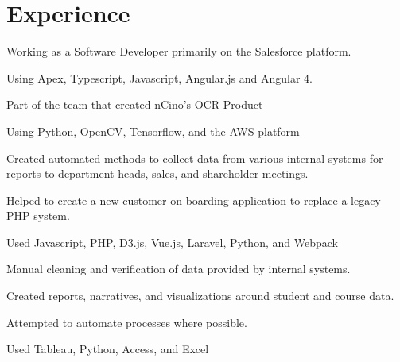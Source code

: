 \documentclass[]{deedy-resume-openfont}
\begin{document}
\begin{minipage}[t]{0.66\textwidth} 


\section{Experience}

\vspace{\topsep} %
\begin{tightemize}
\item Working as a Software Developer primarily on the Salesforce platform. \item Using Apex, Typescript, Javascript, Angular.js and Angular 4. 
\item Part of the team that created nCino's OCR Product
\item Using Python, OpenCV, Tensorflow, and the AWS platform
\end{tightemize}
\sectionsep

\begin{tightemize}
\item Created automated methods to collect data from various internal systems for reports to department heads, sales, and shareholder meetings.
\item Helped to create a new customer on boarding application to replace a legacy PHP system.
\item Used Javascript, PHP, D3.js, Vue.js, Laravel, Python, and Webpack
\end{tightemize}
\sectionsep

\begin{tightemize}
\item Manual cleaning and verification of data provided by internal systems.
\item Created reports, narratives, and visualizations around student and course data. 
\item Attempted to automate processes where possible.
\item Used Tableau, Python, Access, and Excel
\end{tightemize}
\sectionsep


\end{minipage}
\end{document}
